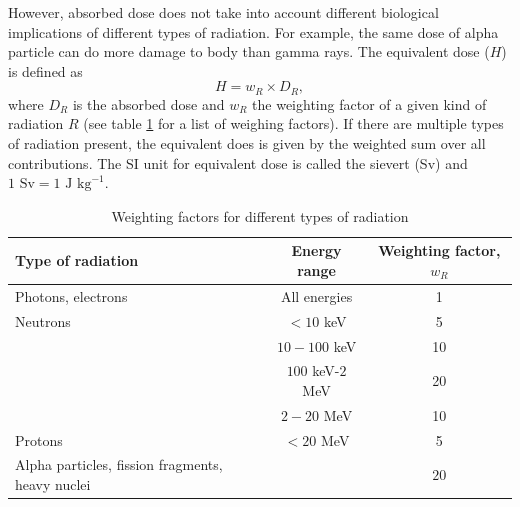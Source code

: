 \documentclass[nofootinbib,preprint,aip,pra]{revtex4-1}
\begin{document}
        However, absorbed dose does not take into account different biological implications of different types
        of radiation.
        For example, the same dose of alpha particle can do more damage to body than gamma rays. The equivalent
        dose ($H$) is defined as
        \begin{equation}
        H=w_R \times D_R,
        \end{equation}
        where $D_R$ is the absorbed dose and $w_R$ the weighting factor of a given kind of radiation $R$
        (see table \ref{tab:eq} for a list of weighing factors). If there are multiple types of radiation 
        present, the equivalent does is given by the weighted sum over all contributions. The SI unit for
        equivalent dose is called the sievert (Sv) and $1\text{ Sv}=1\text{ J kg}^{-1}$.
        \begin{table}
            \label{tab:eq}
            \centering
            \caption{Weighting factors for different types of radiation\cite{icrp74}}
            \begin{ruledtabular}
                \begin{tabular}{l c c}
                Type of radiation & Energy range & Weighting factor, $w_R$\\
                \hline
                Photons, electrons & All energies & 1\\
                Neutrons & $<10$ keV & 5 \\
                         & $10-100$ keV & 10 \\
                         & $100$ keV-$2$ MeV & 20 \\
                         & $2-20$ MeV & 10 \\
                Protons & $<20$ MeV & 5 \\
                Alpha particles, fission fragments, heavy nuclei & & $20$\\
            \end{tabular}
            \end{ruledtabular}
        \end{table}
\end{document}

